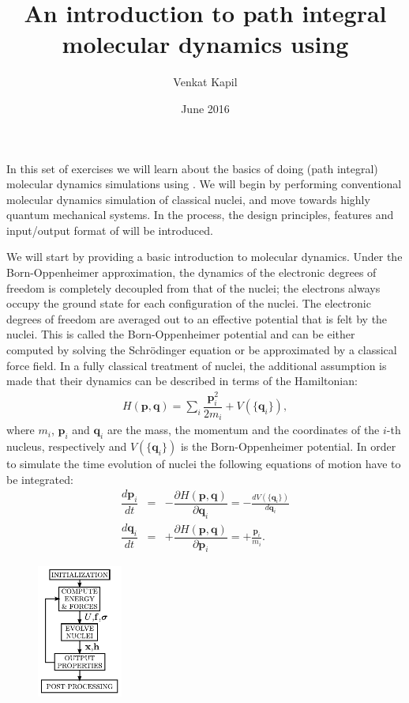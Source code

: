 \documentclass{article}
\title{An introduction to path integral \\molecular dynamics using \ipi{}}
\author{Venkat Kapil}
\date{June 2016}
\begin{document}
\maketitle

In this set of exercises we will learn about the basics of doing (path integral) molecular dynamics simulations using \ipi{}. We will begin by performing conventional molecular dynamics simulation of classical nuclei, and move towards highly quantum mechanical systems. In the process, the design principles, features and input/output format of \ipi{} will be introduced.

\begin{Exercise}[label={i-pi},title={Molecular Dynamics: a client/server approach}]

We will start by providing a basic introduction to molecular dynamics. Under the Born-Oppenheimer approximation, the dynamics of the electronic degrees of freedom is completely decoupled from that of the nuclei; the electrons always occupy the ground state for each configuration of the nuclei. The electronic degrees of freedom are averaged out to an effective potential that is felt by the nuclei. This is called the Born-Oppenheimer potential and can be either computed by solving the Schr\"odinger equation or be approximated by a classical force field. In a fully classical treatment of nuclei, the additional assumption is made that their dynamics can be described in terms of the Hamiltonian:
\begin{eqnarray}
    H(\textbf{p},\textbf{q})=\sum_i \dfrac{\textbf{p}_i^2}{2 m_i} + V(\{\textbf{q}_i\}),
\end{eqnarray}
where $m_i$, $\textbf{p}_i$ and $\textbf{q}_i$ are the mass, the momentum and the coordinates of the $i$-th nucleus, respectively and $V(\{\textbf{q}_i\})$ is the  Born-Oppenheimer potential. In order to simulate the time evolution of nuclei the following equations of motion have to be integrated:
\begin{eqnarray}
   \dfrac{d \textbf{p}_i}{d t}&=& 
   - \dfrac{\partial H(\textbf{p},\textbf{q})}{\partial \textbf{q}_i}=-\frac{d V(\{\textbf{q}_i\})}{d\textbf{q}_i} \\
   \dfrac{d \textbf{q}_i}{d t}&=& 
   + \dfrac{\partial H(\textbf{p},\textbf{q})}{\partial \textbf{p}_i} = + \frac{\textbf{p}_i}{m_i}.
\end{eqnarray}
\begin{figure}[h]
    \begin{center}
    \includegraphics[width=0.25\textwidth]{mdchart.pdf}

\end{center}
\end{figure}
\end{Exercise}
\end{document}
